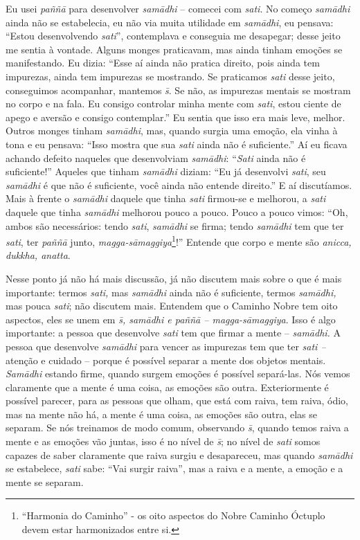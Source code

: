 Eu usei \textit{paññ\=a }para desenvolver \textit{sam\=adhi} –
comecei com \textit{sati}. No começo \textit{sam\=adhi} ainda não se
estabelecia, eu não via muita utilidade em \textit{sam\=adhi}, eu
pensava: “Estou desenvolvendo \textit{sati}”, contemplava e conseguia
me desapegar; desse jeito me sentia à vontade. Alguns monges
praticavam, mas ainda tinham emoções se manifestando. Eu dizia: “Esse
aí ainda não pratica direito, pois ainda tem impurezas, ainda tem
impurezas se mostrando. Se praticamos \textit{sati} desse jeito,
conseguimos acompanhar, mantemos \textit{s\=\ila}. Se não, as impurezas
mentais se mostram no corpo e na fala. Eu consigo controlar minha mente
com \textit{sati}, estou ciente de apego e aversão e consigo
contemplar.” Eu sentia que isso era mais leve, melhor. Outros monges
tinham \textit{sam\=adhi}, mas, quando surgia uma emoção, ela vinha à
tona e eu pensava: “Isso mostra que sua \textit{sati} ainda não é
suficiente.” Aí eu ficava achando defeito naqueles que desenvolviam
\textit{sam\=adhi}: “\textit{Sati} ainda não é suficiente!” Aqueles que
tinham \textit{sam\=adhi} diziam: “Eu já desenvolvi \textit{sati}, seu
\textit{sam\=adhi} é que não é suficiente, você ainda não entende
direito.” E aí discutíamos. Mais à frente o \textit{sam\=adhi} daquele
que tinha \textit{sati} firmou-se e melhorou, a \textit{sati} daquele
que tinha \textit{sam\=adhi} melhorou pouco a pouco. Pouco a pouco
vimos: “Oh, ambos são necessários: tendo \textit{sati},
\textit{sam\=adhi} se firma; tendo \textit{sam\=adhi} tem que ter
\textit{sati}, ter \textit{paññ\=a} junto,
\textit{magga-s\=amaggiya}\footnote{“Harmonia do Caminho” - os oito
aspectos do Nobre Caminho Óctuplo devem estar harmonizados entre si.}!”
Entende que corpo e mente são \textit{anicca, dukkha, anatta}. 

Nesse ponto já não há mais discussão, já não discutem mais sobre o
que é mais importante: termos \textit{sati,} mas \textit{sam\=adhi}
ainda não é suficiente, termos \textit{sam\=adhi,} mas pouca
\textit{sati}; não discutem mais. Entendem que o Caminho Nobre tem oito
aspectos, eles se unem em \textit{s\=\ila, sam\=adhi e paññ\=a –
magga-s\=amaggiya}. Isso é algo importante: a pessoa que desenvolve
\textit{sati} tem que firmar a mente – \textit{sam\=adhi. }A pessoa que
desenvolve \textit{sam\=adhi} para vencer as impurezas tem que ter
\textit{sati –} atenção e cuidado – porque é possível separar a mente
dos objetos mentais. \textit{Sam\=adhi} estando firme, quando surgem
emoções é possível separá-las. Nós vemos claramente que a mente é uma
coisa, as emoções são outra. Exteriormente é possível parecer, para as
pessoas que olham, que está com raiva, tem raiva, ódio, mas na mente
não há, a mente é uma coisa, as emoções são outra, elas se separam. Se
nós treinamos de modo comum, observando \textit{s\=\ila}, quando temos
raiva a mente e as emoções vão juntas, isso é no nível de
\textit{s\=\ila}; no nível de \textit{sati} somos capazes de saber
claramente que raiva surgiu e desapareceu, mas quando
\textit{sam\=adhi} se estabelece, \textit{sati} sabe: “Vai surgir
raiva”, mas a raiva e a mente, a emoção e a mente se separam. 

